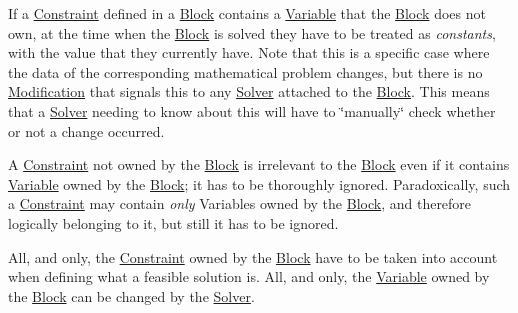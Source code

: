 \begin{DoxyItemize}
\item If a \mbox{\hyperlink{class_s_m_spp__di__unipi__it_1_1_constraint}{Constraint}} defined in a \mbox{\hyperlink{class_s_m_spp__di__unipi__it_1_1_block}{Block}} contains a \mbox{\hyperlink{class_s_m_spp__di__unipi__it_1_1_variable}{Variable}} that the \mbox{\hyperlink{class_s_m_spp__di__unipi__it_1_1_block}{Block}} does not own, at the time when the \mbox{\hyperlink{class_s_m_spp__di__unipi__it_1_1_block}{Block}} is solved they have to be treated as {\itshape constants}, with the value that they currently have. Note that this is a specific case where the data of the corresponding mathematical problem changes, but there is no \mbox{\hyperlink{class_s_m_spp__di__unipi__it_1_1_modification}{Modification}} that signals this to any \mbox{\hyperlink{class_s_m_spp__di__unipi__it_1_1_solver}{Solver}} attached to the \mbox{\hyperlink{class_s_m_spp__di__unipi__it_1_1_block}{Block}}. This means that a \mbox{\hyperlink{class_s_m_spp__di__unipi__it_1_1_solver}{Solver}} needing to know about this will have to \char`\"{}manually\char`\"{} check whether or not a change occurred.
\item A \mbox{\hyperlink{class_s_m_spp__di__unipi__it_1_1_constraint}{Constraint}} not owned by the \mbox{\hyperlink{class_s_m_spp__di__unipi__it_1_1_block}{Block}} is irrelevant to the \mbox{\hyperlink{class_s_m_spp__di__unipi__it_1_1_block}{Block}} even if it contains \mbox{\hyperlink{class_s_m_spp__di__unipi__it_1_1_variable}{Variable}} owned by the \mbox{\hyperlink{class_s_m_spp__di__unipi__it_1_1_block}{Block}}; it has to be thoroughly ignored. Paradoxically, such a \mbox{\hyperlink{class_s_m_spp__di__unipi__it_1_1_constraint}{Constraint}} may contain {\itshape only} Variables owned by the \mbox{\hyperlink{class_s_m_spp__di__unipi__it_1_1_block}{Block}}, and therefore logically belonging to it, but still it has to be ignored.
\item All, and only, the \mbox{\hyperlink{class_s_m_spp__di__unipi__it_1_1_constraint}{Constraint}} owned by the \mbox{\hyperlink{class_s_m_spp__di__unipi__it_1_1_block}{Block}} have to be taken into account when defining what a feasible solution is. All, and only, the \mbox{\hyperlink{class_s_m_spp__di__unipi__it_1_1_variable}{Variable}} owned by the \mbox{\hyperlink{class_s_m_spp__di__unipi__it_1_1_block}{Block}} can be changed by the \mbox{\hyperlink{class_s_m_spp__di__unipi__it_1_1_solver}{Solver}}.
\end{DoxyItemize}

